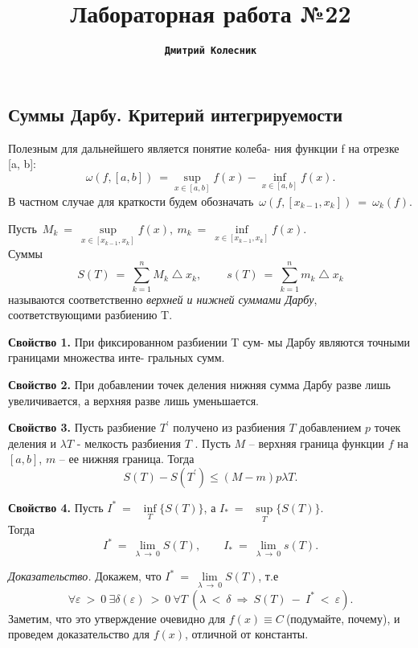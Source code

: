 \documentclass[a4paper,12pt]{article}
\title{Лабораторная работа №22}
\author{\textbf{\texttt{Дмитрий Колесник}}}
\begin{document}
\maketitle

\newpage
\begin{center}
\section{Суммы Дарбу. Критерий
интегрируемости}
\end{center}

Полезным для дальнейшего является понятие колеба-
ния функции f на отрезке [a, b]:
\[ \omega(f, [a, b])\ =\sup_{x\in [a, b]}f(x) - \inf_{x\in [a, b]}f(x). \]
В частном случае для краткости будем обозначать\ $\omega(f, [x_{k - 1}, x_{k}])\ =\ \omega_{k}(f).$

Пусть\ $M_{k}\ =\ \overset{}{\underset{x \in [x_{k-1}, x_k]}{\sup}} f(x),\ m_{k}\ =\ \overset{}{\underset{x \in [x_{k-1}, x_k]}{\inf}} f(x). $\\
Суммы
\[S(T)\ =\ \sum_{k=1}^n M_{k} \bigtriangleup x_{k},\ \qquad s(T)\ =\ \sum_{k=1}^n m_{k} \bigtriangleup x_{k} \]
называются соответственно \textit{верхней и нижней суммами
Дарбу}, соответствующими разбиению T.

\textbf{Свойство 1.} При фиксированном разбиении T сум-
мы Дарбу являются точными границами множества инте-
гральных сумм.

\textbf{Свойство 2.} При добавлении точек деления нижняя
сумма Дарбу разве лишь увеличивается, а верхняя разве
лишь уменьшается.

\textbf{Свойство 3.} Пусть разбиение $T^\prime$ получено из разбиения $T$ добавлением $p$ точек деления и $\lambda T$ - мелкость разбиения $T$ . Пусть $M$ – верхняя граница функции $f$ на $[a, b]$,
$m$ – ее нижняя граница. Тогда
\[S(T) - S(T^\prime) \le (M-m) p \lambda T. \]

\textbf{Свойство 4.} Пусть $I^*\ =\ $ $\overset{}{\underset{T}{\inf}} \{S(T)\}$, а $I_{*}\ =\ $ $\overset{}{\underset{T}{\sup}} \{S(T)\}$.\\
Тогда
\[I^*\ =\ \lim_{\lambda\ \to\ 0} S(T), \qquad I_{*}\ =\ \lim_{\lambda\ \to\ 0} s(T).\]

\textsf{\textit{Доказательство.}} Докажем, что $I^*\ =\ \overset{}{\underset{\lambda\ \to\ 0}{\lim}} S(T)$, т.е 
\[ \forall \varepsilon\ >\ 0\ \exists \delta(\varepsilon)\ >\ 0\ \forall T\ (\lambda\ <\ \delta\ \Rightarrow\ S(T)\ -\ I^*\ <\ \varepsilon). \]
Заметим, что это утверждение очевидно для $f(x) \equiv C\ $(подумайте, почему), и проведем доказательство для $f(x)$, отличной от константы.
\end{document}
